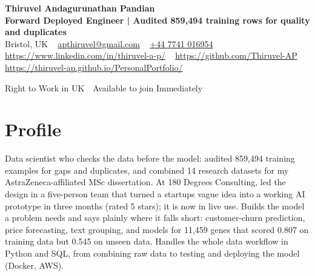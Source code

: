 \documentclass[a4paper,11pt]{article}
\newcommand{\num}[1]{\textbf{#1}}   %
\begin{document}
\begin{center}
  {\LARGE\bfseries Thiruvel Andagurunathan Pandian} \\[3pt]
  {\color{headernavy}\small\textbf{Forward Deployed Engineer | Audited \num{859,494} training rows for quality and duplicates}} \\[3pt]
  {\small
  Bristol, UK\nobreak\ \,\textbar\, \href{mailto:apthiruvel@gmail.com}{apthiruvel@gmail.com}\nobreak\ \,\textbar\, \href{tel:+447741016954}{+44 7741 016954}\nobreak\ \,\textbar\, \href{https://www.linkedin.com/in/thiruvel-a-p/}{https://www.linkedin.com/in/thiruvel-a-p/}\nobreak\ \,\textbar\, \href{https://github.com/Thiruvel-AP}{https://github.com/Thiruvel-AP}\nobreak\ \,\textbar\, \href{https://thiruvel-ap.github.io/PersonalPortfolio/}{https://thiruvel-ap.github.io/PersonalPortfolio/}}\par\vspace{4pt}
  \noindent{} Right to Work in UK \,\textbar\, Available to join Immediately
\end{center}

\section{Profile}
Data scientist who checks the data before the model: audited 859,494 training examples for gaps and duplicates, and combined 14 research datasets for my AstraZeneca-affiliated MSc dissertation. At 180 Degrees Consulting, led the design in a five-person team that turned a startup\textquotesingle{}s vague idea into a working AI prototype in three months (rated 5 stars); it is now in live use. Builds the model a problem needs and says plainly where it falls short: customer-churn prediction, price forecasting, text grouping, and models for 11,459 genes that scored 0.807 on training data but 0.545 on unseen data. Handles the whole data workflow in Python and SQL, from combining raw data to testing and deploying the model (Docker, AWS).
\end{document}
